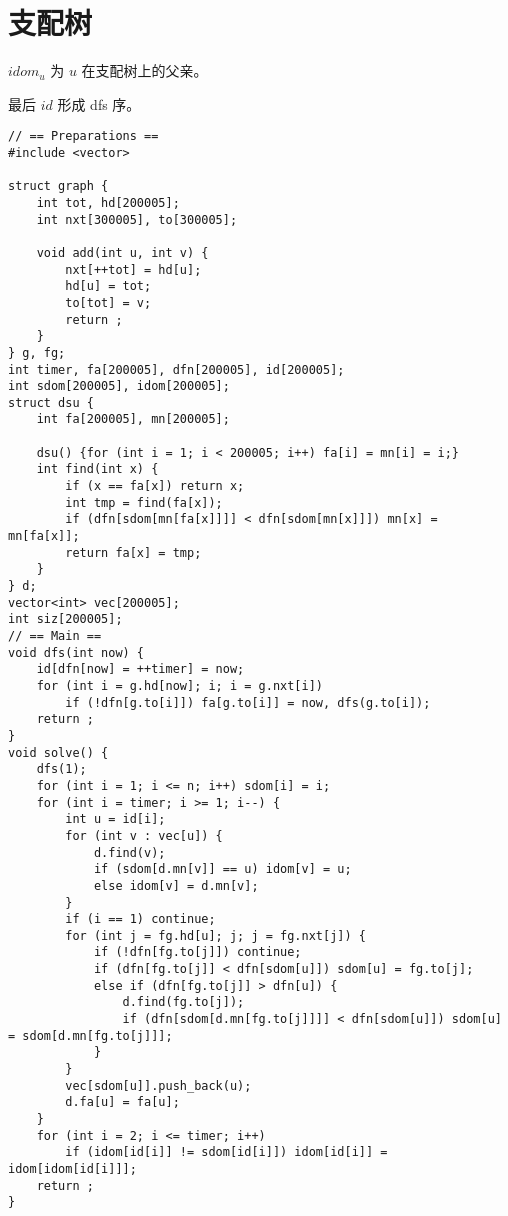 \section{支配树}

$idom_u$ 为 $u$ 在支配树上的父亲。

最后 $id$ 形成 dfs 序。

\begin{verbatim}
// == Preparations ==
#include <vector>

struct graph {
    int tot, hd[200005];
    int nxt[300005], to[300005];
    
    void add(int u, int v) {
        nxt[++tot] = hd[u];
        hd[u] = tot;
        to[tot] = v;
        return ;
    }
} g, fg;
int timer, fa[200005], dfn[200005], id[200005];
int sdom[200005], idom[200005];
struct dsu {
    int fa[200005], mn[200005];

    dsu() {for (int i = 1; i < 200005; i++) fa[i] = mn[i] = i;}
    int find(int x) {
        if (x == fa[x]) return x;
        int tmp = find(fa[x]);
        if (dfn[sdom[mn[fa[x]]]] < dfn[sdom[mn[x]]]) mn[x] = mn[fa[x]];
        return fa[x] = tmp;
    }
} d;
vector<int> vec[200005];
int siz[200005];
// == Main ==
void dfs(int now) {
    id[dfn[now] = ++timer] = now;
    for (int i = g.hd[now]; i; i = g.nxt[i])
        if (!dfn[g.to[i]]) fa[g.to[i]] = now, dfs(g.to[i]);
    return ;
}
void solve() {
    dfs(1);
    for (int i = 1; i <= n; i++) sdom[i] = i;
    for (int i = timer; i >= 1; i--) {
        int u = id[i];
        for (int v : vec[u]) {
            d.find(v);
            if (sdom[d.mn[v]] == u) idom[v] = u;
            else idom[v] = d.mn[v];
        }
        if (i == 1) continue;
        for (int j = fg.hd[u]; j; j = fg.nxt[j]) {
            if (!dfn[fg.to[j]]) continue;
            if (dfn[fg.to[j]] < dfn[sdom[u]]) sdom[u] = fg.to[j];
            else if (dfn[fg.to[j]] > dfn[u]) {
                d.find(fg.to[j]);
                if (dfn[sdom[d.mn[fg.to[j]]]] < dfn[sdom[u]]) sdom[u] = sdom[d.mn[fg.to[j]]];
            }
        }
        vec[sdom[u]].push_back(u);
        d.fa[u] = fa[u];
    }
    for (int i = 2; i <= timer; i++)
        if (idom[id[i]] != sdom[id[i]]) idom[id[i]] = idom[idom[id[i]]];
    return ;
}
\end{verbatim}